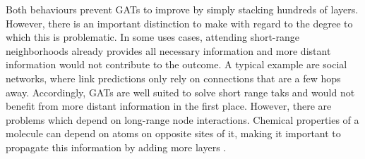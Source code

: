 Both behaviours prevent GATs to improve by simply stacking hundreds of layers. However, there is an important distinction to make with regard to the degree to which this is problematic. In some uses cases, attending short-range neighborhoods already provides all necessary information and more distant information would not contribute to the outcome. A typical example are social networks, where link predictions only rely on connections that are a few hops away. Accordingly, GATs are well suited to solve short range taks and would not benefit from more distant information in the first place. However, there are problems which depend on long-range node interactions. Chemical properties of a molecule can depend on atoms on opposite sites of it, making it important to propagate this information by adding more layers \cite{alon2021bottleneck}.
\bigskip